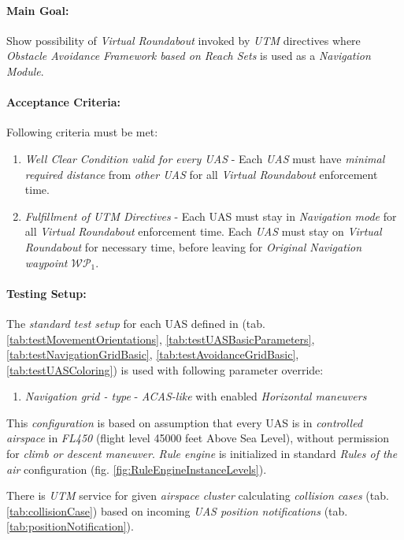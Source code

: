 \paragraph{Main Goal:} Show possibility of \emph{Virtual Roundabout} invoked by \emph{UTM} directives where \emph{Obstacle Avoidance Framework based on Reach Sets} is used as a \emph{Navigation Module}.

\paragraph{Acceptance  Criteria:} Following criteria must be met:

\begin{enumerate}
	\item \emph{Well Clear Condition valid for every UAS} - Each \emph{UAS} must have \emph{minimal required distance} from \emph{other UAS} for all \emph{Virtual Roundabout} enforcement time.
	
	\item \emph{Fulfillment of UTM Directives} - Each UAS must stay in \emph{Navigation mode} for all \emph{Virtual Roundabout} enforcement time. Each \emph{UAS} must stay on \emph{Virtual Roundabout} for necessary time, before leaving for \emph{Original Navigation waypoint $\mathscr{WP}_1$}.
\end{enumerate}

\paragraph{Testing Setup:} The \emph{standard test setup} for each UAS defined in (tab. \ref{tab:testMovementOrientations}, \ref{tab:testUASBasicParameters}, \ref{tab:testNavigationGridBasic}, \ref{tab:testAvoidanceGridBasic}, \ref{tab:testUASColoring}) is used with following parameter override:
\begin{enumerate}
	\item \emph{Navigation grid - type} - \emph{ACAS-like} with enabled \emph{Horizontal maneuvers}
\end{enumerate}

This \emph{configuration} is based on assumption that every UAS is in \emph{controlled airspace} in \emph{FL450} (flight level 45000 feet Above Sea Level), without permission for \emph{climb or descent maneuver}. \emph{Rule engine} is initialized in standard \emph{Rules of the air} configuration (fig. \ref{fig:RuleEngineInstanceLevels}).

There is \emph{UTM} service for given \emph{airspace cluster} calculating \emph{collision cases} (tab. \ref{tab:collisionCase}) based on incoming \emph{UAS position notifications} (tab. \ref{tab:positionNotification}).

